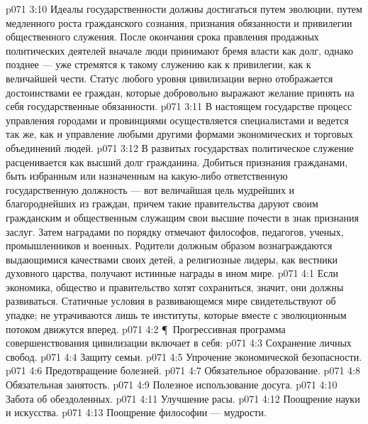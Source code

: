 \vs p071 3:10 Идеалы государственности должны достигаться путем эволюции, путем медленного роста гражданского сознания, признания обязанности и привилегии общественного служения. После окончания срока правления продажных политических деятелей вначале люди принимают бремя власти как долг, однако позднее --- уже стремятся к такому служению как к привилегии, как к величайшей чести. Статус любого уровня цивилизации верно отображается достоинствами ее граждан, которые добровольно выражают желание принять на себя государственные обязанности.
\vs p071 3:11 В настоящем государстве процесс управления городами и провинциями осуществляется специалистами и ведется так же, как и управление любыми другими формами экономических и торговых объединений людей.
\vs p071 3:12 В развитых государствах политическое служение расценивается как высший долг гражданина. Добиться признания гражданами, быть избранным или назначенным на какую\hyp{}либо ответственную государственную должность --- вот величайшая цель мудрейших и благороднейших из граждан, причем такие правительства даруют своим гражданским и общественным служащим свои высшие почести в знак признания заслуг. Затем наградами по порядку отмечают философов, педагогов, ученых, промышленников и военных. Родители должным образом вознаграждаются выдающимися качествами своих детей, а религиозные лидеры, как вестники духовного царства, получают истинные награды в ином мире.
\vs p071 4:1 Если экономика, общество и правительство хотят сохраниться, значит, они должны развиваться. Статичные условия в развивающемся мире свидетельствуют об упадке; не утрачиваются лишь те институты, которые вместе с эволюционным потоком движутся вперед.
\vs p071 4:2 \P\ Прогрессивная программа совершенствования цивилизации включает в себя:
\vs p071 4:3 \bibnobreakspace Сохранение личных свобод.
\vs p071 4:4 \bibnobreakspace Защиту семьи.
\vs p071 4:5 \bibnobreakspace Упрочение экономической безопасности.
\vs p071 4:6 \bibnobreakspace Предотвращение болезней.
\vs p071 4:7 \bibnobreakspace Обязательное образование.
\vs p071 4:8 \bibnobreakspace Обязательная занятость.
\vs p071 4:9 \bibnobreakspace Полезное использование досуга.
\vs p071 4:10 \bibnobreakspace Забота об обездоленных.
\vs p071 4:11 \bibnobreakspace Улучшение расы.
\vs p071 4:12 \bibnobreakspace Поощрение науки и искусства.
\vs p071 4:13 \bibnobreakspace Поощрение философии --- мудрости.
